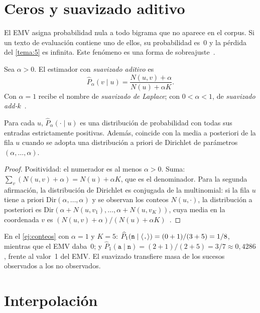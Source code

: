 \section{Ceros y suavizado aditivo}

El EMV asigna probabilidad nula a todo bigrama que no aparece en el corpus. Si un texto de evaluación contiene uno de ellos, su probabilidad es~0 y la pérdida del \cref{tema:5} es infinita. Este fenómeno es una forma de sobreajuste~\cite[§3.5]{jm3}.

\begin{definicion}\label{def:laplace}
Sea $\alpha>0$. El estimador con \emph{suavizado aditivo} es
\[
\widehat{P}_{\alpha}(v\mid u)=\frac{N(u,v)+\alpha}{N(u)+\alpha K}.
\]
Con $\alpha=1$ recibe el nombre de \emph{suavizado de Laplace}; con $0<\alpha<1$, de \emph{suavizado add-$k$}~\cite[§3.6.1–3.6.2]{jm3}.
\end{definicion}

\begin{proposicion}\label{prop:laplace}
Para cada $u$, $\widehat{P}_{\alpha}(\cdot\mid u)$ es una distribución de probabilidad con todas sus entradas estrictamente positivas. Además, coincide con la media a posteriori de la fila $u$ cuando se adopta una distribución a priori de Dirichlet de parámetros $(\alpha,\dots,\alpha)$.
\end{proposicion}

\begin{proof}
Positividad: el numerador es al menos $\alpha>0$. Suma: $\sum_{v}(N(u,v)+\alpha)=N(u)+\alpha K$, que es el denominador. Para la segunda afirmación, la distribución de Dirichlet es conjugada de la multinomial: si la fila $u$ tiene a priori $\mathrm{Dir}(\alpha,\dots,\alpha)$ y se observan los conteos $N(u,\cdot)$, la distribución a posteriori es $\mathrm{Dir}(\alpha+N(u,v_1),\dots,\alpha+N(u,v_K))$, cuya media en la coordenada $v$ es $(N(u,v)+\alpha)/(N(u)+\alpha K)$~\cite[§2.2.1]{bishop}.
\end{proof}

\begin{ejemplo}
En el \cref{ej:conteos} con $\alpha=1$ y $K=5$: $\widehat{P}_1(\texttt{n}\mid\langle\texttt{.}\rangle)=(0+1)/(3+5)=1/8$, mientras que el EMV daba~0; y $\widehat{P}_1(\texttt{a}\mid\texttt{n})=(2+1)/(2+5)=3/7\approx 0{,}4286$, frente al valor~1 del EMV. El suavizado transfiere masa de los sucesos observados a los no observados.
\end{ejemplo}

\section{Interpolación}

